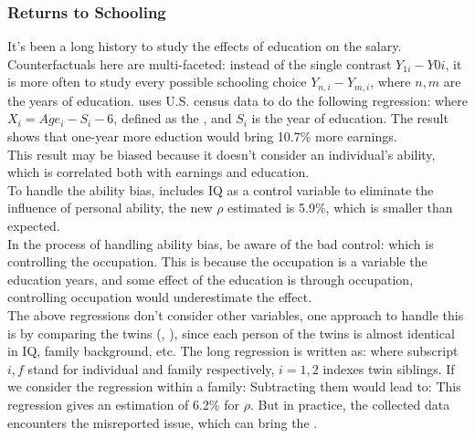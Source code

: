 \documentclass[10pt]{report}
\begin{document}
\subsubsection{Returns to Schooling}
It's been a long history to study the effects of education on the salary. Counterfactuals here are multi-faceted: instead of the
single contrast $Y_{1i}-Y{0i}$, it is more often to study every possible schooling choice $Y_{n,i}-Y_{m,i}$, where $n,m$ are the
years of education.
\cite{mincer1974schooling} uses U.S. census data to do the following regression:
where $X_i=Age_i-S_i-6$, defined as the , and $S_i$ is the year of education. The result shows that one-year more eduction would bring 10.7\% more earnings.\\
This result may be biased because it doesn't consider an individual's ability, which is correlated both with earnings and education.\\
To handle the ability bias, \cite{griliches1977estimating} includes IQ as a control variable to eliminate the influence of personal
ability, the new $\rho$ estimated is 5.9\%, which is smaller than expected.\\
In the process of handling ability bias, be aware of the bad control: which is controlling the occupation. This is because the occupation
is a variable  the education years, and some effect of the education is through occupation, controlling occupation would
underestimate the effect. \\
The above regressions don't consider other variables, one approach to handle this is by comparing the twins
(\cite{ashenfelter1994estimates}, \cite{ashenfelter1998income}), since each person of the twins is almost identical in IQ,
family background, etc. The long regression is written as:
where subscript $i,f$ stand for individual and family respectively, $i=1,2$ indexes twin siblings. If we consider the regression within a family:
Subtracting them would lead to:
This regression gives an estimation of 6.2\% for $\rho$. But in practice, the collected data encounters the misreported issue, which can bring the .
\end{document}
